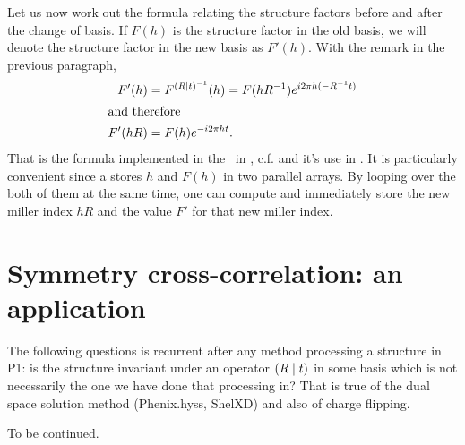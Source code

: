 \documentclass[11pt]{article}
\begin{document}
Let us now work out the formula relating the structure factors before and after the change of basis. If $F(h)$ is the structure factor in the old basis, we will denote the structure factor in the new basis as $F'(h)$. With the remark in the previous paragraph,
\begin{align}
F'(h) &= F^{\left( R \mid t \right)^{-1}}(h) = F(hR^{-1}) e^{i2\pi h(-R^{-1}t)}\nonumber\\
\intertext{and therefore}
F'(hR) &= F(h)e^{-i2\pi ht}.
\end{align}
That is the formula implemented in the \cctbx\ in , c.f.  and it's use in . It is particularly convenient since a  stores $h$ and $F(h)$ in two parallel arrays. By looping over the both of them at the same time, one can compute and immediately store the new miller index $hR$ and the value $F'$ for that new miller index.

\section{Symmetry cross-correlation: an application}

The following questions is recurrent after any method processing a structure in P1: is the structure invariant under an operator $\left( R \mid t \right)$ in some basis which is not necessarily the one we have done that processing in? That is true of the dual space solution method (Phenix.hyss, ShelXD) and also of charge flipping.

To be continued.
\end{document}
